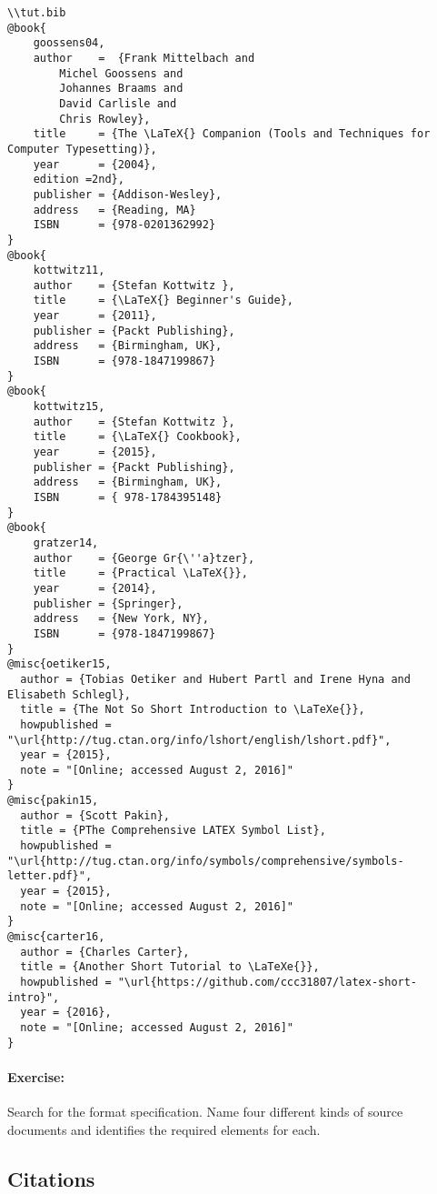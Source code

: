         \begin{verbatim}
\\tut.bib
@book{
    goossens04,
    author    =  {Frank Mittelbach and 
        Michel Goossens and 
        Johannes Braams and 
        David Carlisle and 
        Chris Rowley},
    title     = {The \LaTeX{} Companion (Tools and Techniques for Computer Typesetting)},
    year      = {2004},
    edition =2nd},
    publisher = {Addison-Wesley},
    address   = {Reading, MA}
    ISBN      = {978-0201362992}
}
@book{
    kottwitz11,
    author    = {Stefan Kottwitz },
    title     = {\LaTeX{} Beginner's Guide},
    year      = {2011},
    publisher = {Packt Publishing},
    address   = {Birmingham, UK},
    ISBN      = {978-1847199867}
}
@book{
    kottwitz15,
    author    = {Stefan Kottwitz },
    title     = {\LaTeX{} Cookbook},
    year      = {2015},
    publisher = {Packt Publishing},
    address   = {Birmingham, UK},
    ISBN      = { 978-1784395148}
}
@book{
    gratzer14,
    author    = {George Gr{\''a}tzer},
    title     = {Practical \LaTeX{}},
    year      = {2014},
    publisher = {Springer},
    address   = {New York, NY},
    ISBN      = {978-1847199867}
}
@misc{oetiker15,
  author = {Tobias Oetiker and Hubert Partl and Irene Hyna and Elisabeth Schlegl},
  title = {The Not So Short Introduction to \LaTeXe{}},
  howpublished = "\url{http://tug.ctan.org/info/lshort/english/lshort.pdf}",
  year = {2015}, 
  note = "[Online; accessed August 2, 2016]"
}
@misc{pakin15,
  author = {Scott Pakin},
  title = {PThe Comprehensive LATEX Symbol List},
  howpublished = "\url{http://tug.ctan.org/info/symbols/comprehensive/symbols-letter.pdf}",
  year = {2015}, 
  note = "[Online; accessed August 2, 2016]"
}
@misc{carter16,
  author = {Charles Carter},
  title = {Another Short Tutorial to \LaTeXe{}},
  howpublished = "\url{https://github.com/ccc31807/latex-short-intro}",
  year = {2016}, 
  note = "[Online; accessed August 2, 2016]"
}
        \end{verbatim}

        \paragraph{Exercise:} Search for the \bib{} format specification. Name four different kinds of source documents and identifies the required elements for each.

    \subsection{Citations}
    \label{Citations}

